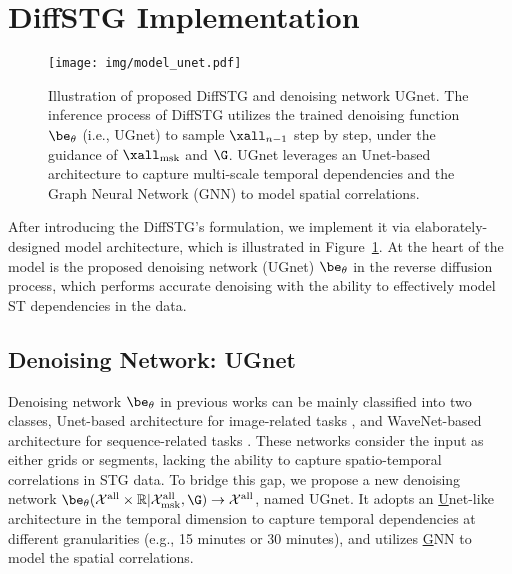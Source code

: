 {\begin{algorithm}[htbp]
\end{algorithm}

\section{DiffSTG Implementation} \label{sec:model_implement}

\begin{figure*}[htbp]
    \centering
    \texttt{[image: img/model\_unet.pdf]} 
    \vspace{-10pt}
    \caption{Illustration of proposed DiffSTG and denoising network UGnet. The inference process of DiffSTG  utilizes the trained denoising function $\be_{\theta}$ (i.e., UGnet) to sample $\xall_{n-1}$ step by step, under the guidance of $\xall_{\rm msk}$ and $\G$. UGnet leverages an Unet-based architecture to capture multi-scale temporal dependencies and the Graph Neural Network (GNN) to model spatial correlations.}
    \vspace{-5pt}
    \label{fig:model}
\end{figure*}

\par After introducing the DiffSTG's formulation, we implement it via elaborately-designed model architecture, which is illustrated in Figure~\ref{fig:model}. At the heart of the model is the proposed denoising network (UGnet) $\be_{\theta}$ in the reverse diffusion process, which performs accurate denoising with the ability to effectively model ST dependencies in the data.

\subsection{Denoising Network: UGnet}
\par  Denoising network $\be_{\theta}$ in previous works can be mainly classified into two classes, Unet-based architecture \cite{ronneberger2015u} for image-related tasks \cite{rombach2022high,voleti2022mcvd, ho2020denoising},
and WaveNet-based architecture \cite{vanwavenet} for sequence-related tasks \cite{kong2020diffwave, liu2022diffsinger, kim2020glow}. These networks consider the input as either grids or segments, lacking the ability to capture spatio-temporal correlations in STG data. To bridge this gap, we propose a new denoising network $\be_\theta({\mathcal X}^{\rm all} \times {\mathbb R} | {\mathcal X}_{\rm msk}^{\rm all}, \G) \rightarrow {\mathcal X}^{\rm all}$, named UGnet. It adopts an \underline{U}net-like architecture in the temporal dimension to capture temporal dependencies at different granularities (e.g., 15 minutes or 30 minutes), and utilizes \underline{G}NN to model the spatial correlations.

}
